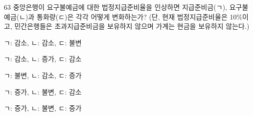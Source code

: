 \begin{question}{63}
중앙은행이 요구불예금에 대한 법정지급준비율을 인상하면 지급준비금(ㄱ), 요구불예금(ㄴ)과 통화량(ㄷ)은 각각 어떻게 변화하는가? (단, 현재 법정지급준비율은 10\%이고, 민간은행들은 초과지급준비금을 보유하지 않으며 가계는 현금을 보유하지 않는다.)
\begin{choices}
  \item ㄱ: 감소, ㄴ: 감소, ㄷ: 불변
  \item ㄱ: 감소, ㄴ: 증가, ㄷ: 감소
  \item ㄱ: 불변, ㄴ: 감소, ㄷ: 증가
  \item ㄱ: 증가, ㄴ: 불변, ㄷ: 감소
  \item ㄱ: 증가, ㄴ: 불변, ㄷ: 증가
\end{choices}
\end{question}
\answerall
{}
